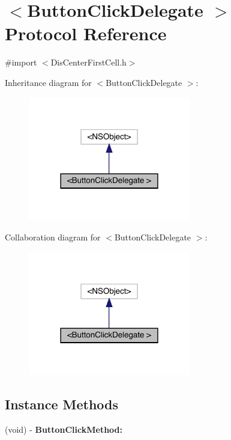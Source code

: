 \hypertarget{protocol_button_click_delegate_01-p}{}\section{$<$Button\+Click\+Delegate $>$ Protocol Reference}
\label{protocol_button_click_delegate_01-p}


{\ttfamily \#import $<$Dis\+Center\+First\+Cell.\+h$>$}



Inheritance diagram for $<$Button\+Click\+Delegate $>$\+:\nopagebreak
\begin{figure}[H]
\begin{center}
\leavevmode
\includegraphics[width=201pt]{protocol_button_click_delegate_01-p__inherit__graph}
\end{center}
\end{figure}


Collaboration diagram for $<$Button\+Click\+Delegate $>$\+:\nopagebreak
\begin{figure}[H]
\begin{center}
\leavevmode
\includegraphics[width=201pt]{protocol_button_click_delegate_01-p__coll__graph}
\end{center}
\end{figure}
\subsection*{Instance Methods}
\begin{DoxyCompactItemize}
\item 
\mbox{\label{protocol_button_click_delegate_01-p_a4803508358b15ec75441ed95fcfdd206}} 
(void) -\/ {\bfseries Button\+Click\+Method\+:}
\end{DoxyCompactItemize}


